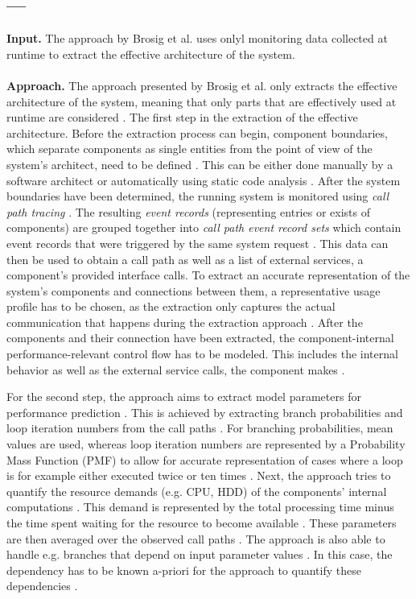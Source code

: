 \subsection{--- \cite{Brosig2011}}
\label{sec:Results:Brosig}
\textbf{Input.}
The approach by Brosig et al. uses onlyl monitoring data collected at runtime to extract the effective architecture \cite{Israr2007interaction} of the system.
\\ \\
\textbf{Approach.}
The approach presented by Brosig et al. only extracts the effective architecture \cite{Israr2007interaction} of the system, meaning that only parts that are effectively used at runtime are considered \cite{Brosig2011}.
The first step in the extraction of the effective architecture.
Before the extraction process can begin, component boundaries, which separate components as single entities from the point of view of the system's architect, need to be defined \cite{Brosig2011}.
This can be either done manually by a software architect or automatically using static code analysis \cite{Brosig2011}.
After the system boundaries have been determined, the running system is monitored using \textit{call path tracing} \cite{Brosig2011}.
The resulting \textit{event records} (representing entries or exists of components) are grouped together into \textit{call path event record sets} which contain event records that were triggered by the same system request \cite{Brosig2011}.
This data can then be used to obtain a call path \cite{Brosig2011} as well as a list of external services, a component's provided interface calls.
To extract an accurate representation of the system's components and connections between them, a representative usage profile has to be chosen, as the extraction only captures the actual communication that happens during the extraction approach \cite{Brosig2011}.
After the components and their connection have been extracted, the component-internal performance-relevant control flow has to be modeled.
This includes the internal behavior as well as the external service calls, the component makes \cite{Brosig2011}.

For the second step, the approach aims to extract model parameters for performance prediction \cite{Brosig2011}.
This is achieved by extracting branch probabilities and loop iteration numbers from the call paths \cite{Brosig2011}.
For branching probabilities, mean values are used, whereas loop iteration numbers are represented by a Probability Mass Function (PMF) to allow for accurate representation of cases where a loop is for example either executed twice or ten times \cite{Brosig2011}.
Next, the approach tries to quantify the resource demands (e.g. CPU, HDD) of the components' internal computations \cite{Brosig2011}.
This demand is represented by the total processing time minus the time spent waiting for the resource to become available \cite{Brosig2011}.
These parameters are then averaged over the observed call paths \cite{Brosig2011}.
The approach is also able to handle e.g. branches that depend on input parameter values \cite{Brosig2011}.
In this case, the dependency has to be known a-priori for the approach to quantify these dependencies \cite{Brosig2011}.

